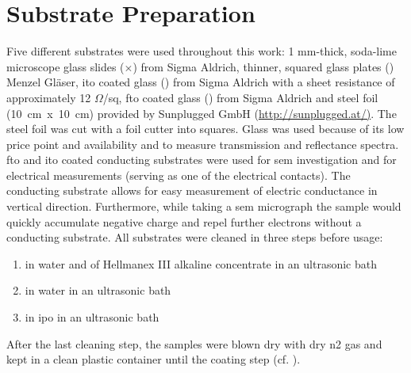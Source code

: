\section{Substrate Preparation}
Five different substrates were used throughout this work: 
1 mm-thick, soda-lime microscope glass slides 
($\times$) from Sigma Aldrich, thinner, 
squared glass plates (\x{}) Menzel Gläser,
\gls{ito} coated glass (\x{}) from Sigma Aldrich with a sheet resistance of approximately 12 $\Omega$/sq, 
\gls{fto} coated glass (\x{}) from Sigma Aldrich and steel foil (10~cm~x~10~cm) provided by Sunplugged GmbH (\url{http://sunplugged.at/)}.
%
The steel foil was cut with a foil cutter into \x{} squares.
Glass was used because of its low price point and availability and to measure transmission and reflectance spectra. 
\Gls{fto} and \gls{ito} coated conducting substrates were used for \gls{sem} investigation and for electrical measurements (serving as one of the electrical contacts).
The conducting substrate allows for easy measurement of electric conductance in vertical direction.
Furthermore, while taking a \gls{sem} micrograph the sample would quickly accumulate negative charge and repel further electrons without a conducting substrate.
All substrates were cleaned in three steps before usage:
\begin{enumerate}
	\item {} in  \gls{water} and  of Hellmanex III alkaline concentrate in an ultrasonic bath
	\item {} in \gls{water} in an ultrasonic bath
	\item {} in \gls{ipo} in an ultrasonic bath 
\end{enumerate}
After the last cleaning step, the samples were blown dry with dry \gls{n2} gas and kept in a clean plastic container until the coating step (cf. \cite{YAMASHITA2018,Kohli2010}).

